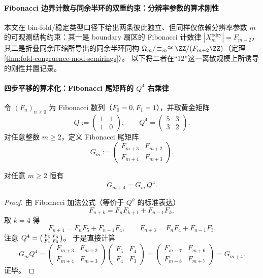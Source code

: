 \paragraph{Fibonacci 边界计数与同余半环的双重约束：分辨率参数的算术刚性}\label{par:resolution-arithmetic-rigidities-fib-bdry-congruence}
本文在 bin-fold/稳定类型口径下给出两条彼此独立、但同样仅依赖分辨率参数 \(m\) 的可观测结构约束：其一是 boundary 扇区的 Fibonacci 计数律 \(|X^{\mathrm{bdry}}_m|=F_{m-2}\)，其二是折叠同余压缩所导出的同余半环同构 \(\Omega_m/\!\equiv_m\cong \ZZ/(F_{m+2}\ZZ)\)（定理 \ref{thm:fold-congruence-mod-semirings}）。
以下将二者在“\(12\)”这一离散规模上所诱导的刚性并置记录。

\paragraph{四步平移的算术化：Fibonacci 尾矩阵的 \texorpdfstring{$Q^4$}{Q4} 右乘律}\label{par:resolution-shift4-fib-matrix-q4}
令 \((F_n)_{n\ge 0}\) 为 Fibonacci 数列（\(F_0=0,F_1=1\)），并取黄金矩阵
\[
Q:=\begin{pmatrix}1&1\\[2pt]1&0\end{pmatrix},
\qquad
Q^4=\begin{pmatrix}5&3\\[2pt]3&2\end{pmatrix}.
\]
对任意整数 \(m\ge 2\)，定义 Fibonacci 尾矩阵
\[
G_m:=\begin{pmatrix}F_{m+3}&F_{m+2}\\[2pt]F_{m+4}&F_{m+3}\end{pmatrix}.
\]

\begin{proposition}[四阶分辨率重整化的严格矩阵律]\label{prop:resolution-shift4-fib-matrix-law}
对任意 \(m\ge 2\) 恒有
\[
G_{m+4}=G_m\,Q^4.
\]
\end{proposition}
\begin{proof}
由 Fibonacci 加法公式（等价于 \(Q^k\) 的标准表达）
\[
F_{n+k}=F_nF_{k+1}+F_{n-1}F_k,
\]
取 \(k=4\) 得
\[
F_{n+4}=F_nF_5+F_{n-1}F_4,\qquad
F_{n+3}=F_nF_4+F_{n-1}F_3.
\]
注意 \(Q^4=\begin{psmallmatrix}F_5&F_4\\ F_4&F_3\end{psmallmatrix}\)。
于是直接计算
\[
G_mQ^4
=
\begin{pmatrix}F_{m+3}&F_{m+2}\\[2pt]F_{m+4}&F_{m+3}\end{pmatrix}
\begin{pmatrix}F_5&F_4\\[2pt]F_4&F_3\end{pmatrix}
=
\begin{pmatrix}F_{m+7}&F_{m+6}\\[2pt]F_{m+8}&F_{m+7}\end{pmatrix}
=G_{m+4}.
\]
证毕。
\end{proof}

